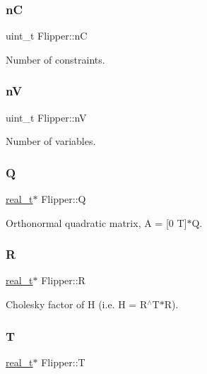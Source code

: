 \subsubsection{\texorpdfstring{nC}{nC}}
{\footnotesize\ttfamily uint\+\_\+t Flipper\+::nC\hspace{0.3cm}{\ttfamily [protected]}}

Number of constraints. \mbox{\label{class_flipper_ab552c3e3a524753f39d3010e8c58a505}} 
\subsubsection{\texorpdfstring{nV}{nV}}
{\footnotesize\ttfamily uint\+\_\+t Flipper\+::nV\hspace{0.3cm}{\ttfamily [protected]}}

Number of variables. \mbox{\label{class_flipper_afae7213a4c38a150512faac9ac572ceb}} 
\subsubsection{\texorpdfstring{Q}{Q}}
{\footnotesize\ttfamily \hyperlink{qp_o_a_s_e_s__wrapper_8h_a0d00e2b3dfadee81331bbb39068570c4}{real\+\_\+t}$\ast$ Flipper\+::Q\hspace{0.3cm}{\ttfamily [protected]}}

Orthonormal quadratic matrix, A = \mbox{[}0 T\mbox{]}$\ast$Q\textquotesingle{}. \mbox{\label{class_flipper_a8d49f4f458ba1b15de596695cd50d5aa}} 
\subsubsection{\texorpdfstring{R}{R}}
{\footnotesize\ttfamily \hyperlink{qp_o_a_s_e_s__wrapper_8h_a0d00e2b3dfadee81331bbb39068570c4}{real\+\_\+t}$\ast$ Flipper\+::R\hspace{0.3cm}{\ttfamily [protected]}}

Cholesky factor of H (i.\+e. H = R$^\wedge$\+T$\ast$R). \mbox{\label{class_flipper_a5d401205baa5348982119da87a0ef4da}} 
\subsubsection{\texorpdfstring{T}{T}}
{\footnotesize\ttfamily \hyperlink{qp_o_a_s_e_s__wrapper_8h_a0d00e2b3dfadee81331bbb39068570c4}{real\+\_\+t}$\ast$ Flipper\+::T\hspace{0.3cm}{\ttfamily [protected]}}

